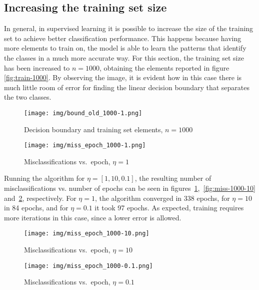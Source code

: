 \documentclass[12pt]{article}
\begin{document}
\subsection{Increasing the training set size}

In general, in supervised learning it is possible to increase the size of the training set to achieve better classification performance.
This happens because having more elements to train on, the model is able to learn the patterns that identify the classes in a much more accurate way.
For this section, the training set size has been increased to $n=1000$, obtaining the elements reported in figure \ref{fig:train-1000}.
By observing the image, it is evident how in this case there is much little room of error for finding the linear decision boundary that separates the two classes.

\begin{figure} [h]
    \begin{minipage}{0.45\linewidth}
    \centering
        \texttt{[image: img/bound\_old\_1000-1.png]}
        \caption{Decision boundary and training set elements, $n=1000$}
        \label{fig:train-1000}
    \end{minipage}
    \hspace{0.5cm}
    \begin{minipage}{0.45\linewidth}
    \centering
        \texttt{[image: img/miss\_epoch\_1000-1.png]}
        \caption{Misclassifications vs.\ epoch, $\eta=1$}
        \label{fig:miss-1000-1}
    \end{minipage}
\end{figure}

Running the algorithm for $\eta = [1, 10, 0.1]$, the resulting number of misclassifications vs. number of epochs can be seen in figures~\ref{fig:miss-1000-1},~\ref{fig:miss-1000-10} and~\ref{fig:miss-1000-01}, respectively.
For $\eta=1$, the algorithm converged in 338 epochs, for $\eta=10$ in 84 epochs, and for $\eta=0.1$ it took 97 epochs.
As expected, training requires more iterations in this case, since a lower error is allowed.

\begin{figure} [h]
    \begin{minipage}{0.45\linewidth}
    \centering
        \texttt{[image: img/miss\_epoch\_1000-10.png]}
        \caption{Misclassifications vs.\ epoch, $\eta=10$}
        \label{fig:miss-1000-10}
    \end{minipage}
    \hspace{0.5cm}
    \begin{minipage}{0.45\linewidth}
    \centering
        \texttt{[image: img/miss\_epoch\_1000-0.1.png]}
        \caption{Misclassifications vs.\ epoch, $\eta=0.1$}
        \label{fig:miss-1000-01}
    \end{minipage}
\end{figure}
\end{document}
